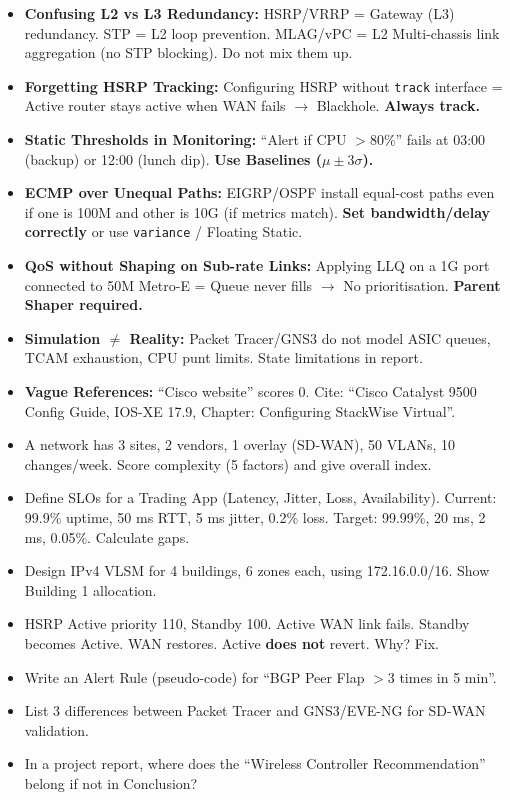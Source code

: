 \documentclass[11pt]{article}
\begin{document}
\begin{attention}
\begin{itemize}
\item \textbf{Confusing L2 vs L3 Redundancy:} HSRP/VRRP = Gateway (L3) redundancy. STP = L2 loop prevention. MLAG/vPC = L2 Multi-chassis link aggregation (no STP blocking). Do not mix them up.
\item \textbf{Forgetting HSRP Tracking:} Configuring HSRP without \texttt{track} interface = Active router stays active when WAN fails $\rightarrow$ Blackhole. \textbf{Always track.}
\item \textbf{Static Thresholds in Monitoring:} ``Alert if CPU $> 80\%$'' fails at 03:00 (backup) or 12:00 (lunch dip). \textbf{Use Baselines ($\mu \pm 3\sigma$).}
\item \textbf{ECMP over Unequal Paths:} EIGRP/OSPF install equal-cost paths even if one is 100M and other is 10G (if metrics match). \textbf{Set bandwidth/delay correctly} or use \texttt{variance} / Floating Static.
\item \textbf{QoS without Shaping on Sub-rate Links:} Applying LLQ on a 1G port connected to 50M Metro-E = Queue never fills $\rightarrow$ No prioritisation. \textbf{Parent Shaper required.}
\item \textbf{Simulation $\neq$ Reality:} Packet Tracer/GNS3 do not model ASIC queues, TCAM exhaustion, CPU punt limits. State limitations in report.
\item \textbf{Vague References:} ``Cisco website'' scores 0. Cite: ``Cisco Catalyst 9500 Config Guide, IOS-XE 17.9, Chapter: Configuring StackWise Virtual''.
\end{itemize}
\end{attention}

\begin{exercice}
\begin{itemize}
\item A network has 3 sites, 2 vendors, 1 overlay (SD-WAN), 50 VLANs, 10 changes/week. Score complexity (5 factors) and give overall index.
\item Define SLOs for a Trading App (Latency, Jitter, Loss, Availability). Current: 99.9\% uptime, 50 ms RTT, 5 ms jitter, 0.2\% loss. Target: 99.99\%, 20 ms, 2 ms, 0.05\%. Calculate gaps.
\item Design IPv4 VLSM for 4 buildings, 6 zones each, using 172.16.0.0/16. Show Building 1 allocation.
\item HSRP Active priority 110, Standby 100. Active WAN link fails. Standby becomes Active. WAN restores. Active \textbf{does not} revert. Why? Fix.
\item Write an Alert Rule (pseudo-code) for ``BGP Peer Flap $> 3$ times in 5 min''.
\item List 3 differences between Packet Tracer and GNS3/EVE-NG for SD-WAN validation.
\item In a project report, where does the ``Wireless Controller Recommendation'' belong if not in Conclusion?
\end{itemize}
\end{exercice}
\end{document}
